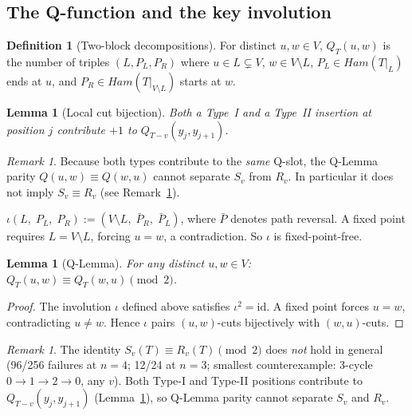 \documentclass[12pt,reqno]{amsart}
\theoremstyle{plain}
\newtheorem{lemma}[theorem]{Lemma}
\theoremstyle{definition}
\newtheorem{definition}[theorem]{Definition}
\theoremstyle{remark}
\newtheorem{remark}[theorem]{Remark}
\newcommand{\Ham}{\mathrm{Ham}}
\newcommand{\id}{\mathrm{id}}
\renewcommand{\Ham}{Ham}%
\begin{document}
\subsection{The Q-function and the key involution}

\begin{definition}[Two-block decompositions]\label{def:Q}
For distinct $u,w\in V$, $Q_T(u,w)$ is the number of triples $(L, P_L, P_R)$
where $u\in L\subsetneq V$, $w\in V\setminus L$, $P_L\in\Ham(T|_L)$ ends at $u$,
and $P_R\in\Ham(T|_{V\setminus L})$ starts at $w$.
\end{definition}

\begin{lemma}[Local cut bijection]\label{lem:local_cut}
Both a Type~I and a Type~II insertion at position $j$ contribute
$+1$ to $Q_{T{-}v}(y_j, y_{j+1})$.
\end{lemma}
\begin{remark}
Because both types contribute to the \emph{same} Q-slot,
the Q-Lemma parity $Q(u,w)\equiv Q(w,u)$ cannot separate $S_v$
from $R_v$. In particular it does not imply $S_v \equiv R_v$
(see Remark~\ref{rem:sv_rv_false}).
\end{remark}

\begin{highlightbox}[title={\textbf{The realized-cut involution $\iota$}}]
$\iota(L,\;P_L,\;P_R) := (V\setminus L,\;\bar{P}_R,\;\bar{P}_L)$,
where $\bar{P}$ denotes path reversal. A fixed point requires $L=V\setminus L$,
forcing $u=w$, a contradiction. So $\iota$ is fixed-point-free.
\end{highlightbox}

\begin{lemma}[Q-Lemma]\label{lem:toggle}
For any distinct $u,w\in V$: $Q_T(u,w) \equiv Q_T(w,u) \pmod{2}$.
\end{lemma}
\begin{proof}
The involution $\iota$ defined above satisfies $\iota^2=\id$. A fixed point
forces $u=w$, contradicting $u\ne w$. Hence $\iota$ pairs $(u,w)$-cuts
bijectively with $(w,u)$-cuts.
\end{proof}

\begin{remark}\label{rem:sv_rv_false}
The identity $S_v(T) \equiv R_v(T) \pmod{2}$ does \emph{not} hold in general
(96/256 failures at $n=4$; 12/24 at $n=3$; smallest counterexample:
3-cycle $0{\to}1{\to}2{\to}0$, any $v$).
Both Type-I and Type-II positions contribute to $Q_{T{-}v}(y_j,y_{j+1})$
(Lemma~\ref{lem:local_cut}), so Q-Lemma parity cannot separate $S_v$ and $R_v$.
\end{remark}
\end{document}
